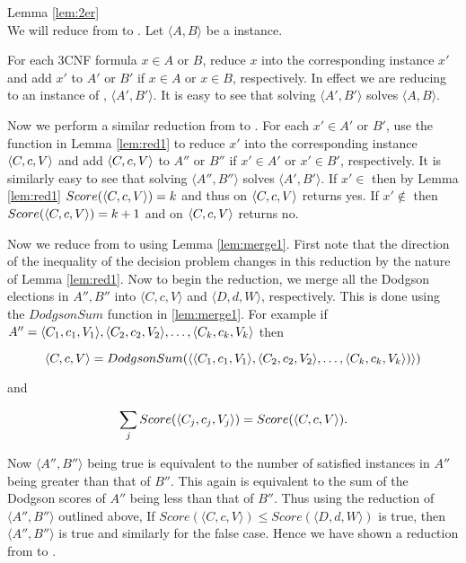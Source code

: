 \begin{claimproof}{Lemma \ref{lem:2er}}\\
    We will reduce from \csat to .
    Let $\langle A,B \rangle$ be a \csat instance.

    For each 3CNF formula $x \in A$ or $B$, reduce $x$ into
    the corresponding  instance $x'$ and add $x'$
    to $A'$ or $B'$ if $x\in A$ or $x \in B$, respectively.
    In effect we are reducing \csat to an instance of
    , $\langle A', B' \rangle$.
    It is easy to see that solving $\langle A', B' \rangle$
    solves $\langle A, B \rangle$.

    Now we perform a similar reduction from 
    to .
    For each $x' \in A'$ or $B'$, use the function in
    Lemma \ref{lem:red1} to reduce $x'$ into the corresponding
    \dscore instance $\langle C,c,V \rangle$ and add $\langle C,c,V \rangle$
    to $A''$ or $B''$ if $x'\in A'$ or $x' \in B'$, respectively.
    It is similarly easy to see that solving $\langle A'', B'' \rangle$
    solves $\langle A', B' \rangle$.
    If $x' \in$  then by Lemma \ref{lem:red1}
    $Score(\langle C,c,V \rangle) = k$ and thus \dscore on $\langle C,c,V \rangle$ returns yes.
    If $x' \notin$  then
    $Score(\langle C,c,V \rangle) = k+1$ and \dscore on $\langle C,c,V \rangle$ returns no.

    Now we reduce from  to 
    using Lemma \ref{lem:merge1}.
    First note that the direction of the inequality of the decision problem
    changes in this reduction by the nature of Lemma \ref{lem:red1}.
    Now to begin the reduction, we merge all the Dodgson elections
    in $A'', B''$ into $\langle C,c,V \rangle$ and $\langle D,d,W \rangle$,
    respectively.
    This is done using the $DodgsonSum$ function in \ref{lem:merge1}.
    For example if $A'' = \langle C_{1},c_{1},V_{1} \rangle,\langle C_{2},c_{2},V_{2} \rangle, \dots, \langle C_{k},c_{k},V_{k} \rangle$
    then

    \[\langle C,c,V \rangle = DodgsonSum(\langle \langle C_{1},c_{1},V_{1} \rangle,\langle C_{2},c_{2},V_{2} \rangle, \dots,
    \langle C_{k},c_{k},V_{k} \rangle) \rangle)\]

    and

    \[\sum_j Score(\langle C_{j},c_{j},V_{j} \rangle) =
    Score(\langle C,c,V \rangle).\]

    Now $\langle A'', B'' \rangle$ being true is equivalent to
    the number of satisfied \dscore instances in $A''$ being greater than
    that of $B''$.
    This again is equivalent to the sum of the Dodgson
    scores of $A''$ being less than that of $B''$.
    Thus using the reduction of $\langle A'', B'' \rangle$ outlined above,
    If $Score(\langle C,c,V \rangle)\leq Score(\langle D,d,W \rangle)$ is true,
    then $\langle A'', B'' \rangle$ is true and similarly for the false case.
    Hence we have shown a reduction from  to
    .


\end{claimproof}
